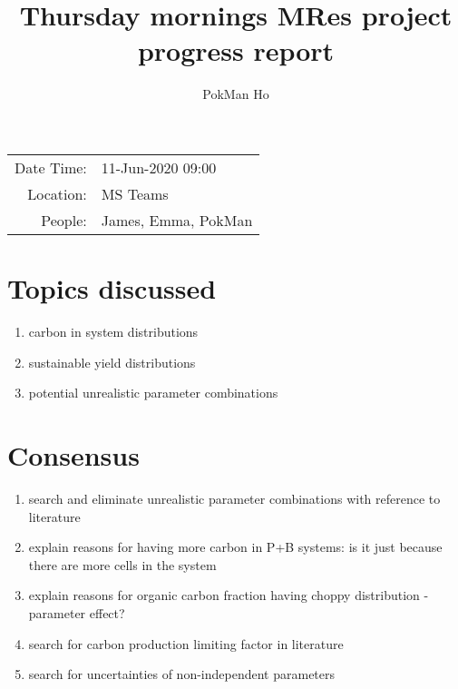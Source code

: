 \documentclass[a4paper,11pt]{article}
\title{Thursday mornings MRes project progress report}
\author{PokMan Ho}
\date{}
\begin{document}
    \maketitle
    
    \begin{tabular}{rl}
        Date Time: & 11-Jun-2020 09:00 \\
        Location: & MS Teams \\
        People: & James, Emma, PokMan \\
    \end{tabular}
    
    \section{Topics discussed}
    \begin{enumerate}
        \item carbon in system distributions
        \item sustainable yield distributions
        \item potential unrealistic parameter combinations
    \end{enumerate}
    
    \section{Consensus}
    \begin{enumerate}
        \item search and eliminate unrealistic parameter combinations with reference to literature
        \item explain reasons for having more carbon in P+B systems: is it just because there are more cells in the system
        \item explain reasons for organic carbon fraction having choppy distribution - parameter effect?
        \item search for carbon production limiting factor in literature
        \item search for uncertainties of non-independent parameters
    \end{enumerate}
\end{document}
